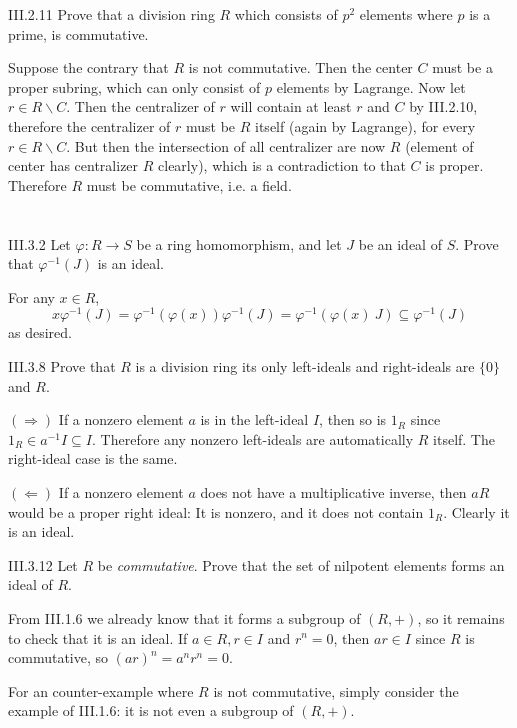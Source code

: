 \begin{problem}{III.2.11}
Prove that a division ring $R$ which consists of $p^2$ elements where $p$ is a prime, is commutative. 
\end{problem}
\begin{pf}
Suppose the contrary that $R$ is not commutative. Then the center $C$ must be a proper subring, which can only consist of $p$ elements by Lagrange. Now let $r \in R \backslash C$. Then the centralizer of $r$ will contain at least $r$ and $C$ by III.2.10, therefore the centralizer of $r$ must be $R$ itself (again by Lagrange), for every $r \in R \backslash C$. But then the intersection of all centralizer are now $R$ (element of center has centralizer $R$ clearly), which is a contradiction to that $C$ is proper. Therefore $R$ must be commutative, i.e. a field.
\end{pf}

\section{}

\begin{problem}{III.3.2}
Let $\varphi:R \to S$ be a ring homomorphism, and let $J$ be an ideal of $S$. Prove that $\varphi^{-1}(J)$ is an ideal.
\end{problem}
\begin{pf}
For any $x \in R$, 
\[
x \varphi^{-1}(J) = \varphi^{-1}(\varphi(x))\varphi^{-1}(J) = \varphi^{-1}(\varphi(x) \: J) \subseteq \varphi^{-1}(J)
\]
as desired.
\end{pf}

\begin{problem}{III.3.8}
Prove that $R$ is a division ring \iffw its only left-ideals and right-ideals are $\{0\}$ and $R$.
\end{problem}
\begin{pf}

\noindent $(\Rightarrow)$ If a nonzero element $a$ is in the left-ideal $I$, then so is $1_R$ since $1_R \in a^{-1}I \subseteq I$. Therefore any nonzero left-ideals are automatically $R$ itself. The right-ideal case is the same.

\noindent $(\Leftarrow)$ If a nonzero element $a$ does not have a multiplicative inverse, then $aR$ would be a proper right ideal: It is nonzero, and it does not contain $1_R$. Clearly it is an ideal.
\end{pf}

\begin{problem}{III.3.12}
Let $R$ be \emph{commutative}. Prove that the set of nilpotent elements forms an ideal of $R$.
\end{problem}
\begin{pf}
From III.1.6 we already know that it forms a subgroup of $(R,+)$, so it remains to check that it is an ideal. If $a \in R, r \in I$ and $r^n = 0$, then $ar \in I$ since $R$ is commutative, so $(ar)^n = a^nr^n = 0$.

For an counter-example where $R$ is not commutative, simply consider the example of III.1.6: it is not even a subgroup of $(R, +)$.
\end{pf}

